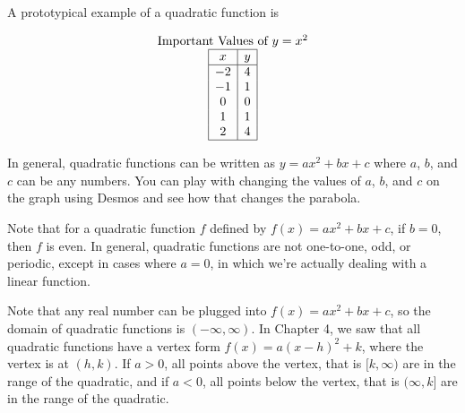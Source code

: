 \documentclass[nooutcomes]{ximera}
\begin{document}
\begin{example}
A prototypical example of a quadratic function is 

\begin{center}
\end{center}

\begin{center}
\end{center}

\[
\begin{array}{c  }
\text{\normalfont Important Values of $y=x^2$} \\
 \begin{array}{|c|c|}
 \hline
 x & y\\
 \hline
 -2&4\\
 -1&1\\
 0&0\\
 1&1\\
 2&4\\
 \hline
\end{array}
\end{array}
\]
\end{example}

In general, quadratic functions can be written as $y=ax^2+bx+c$ where $a$, $b$, and $c$ can be any numbers.  You can play with changing the values of $a$, $b$, and $c$ on the graph using Desmos and see how that changes the parabola.  

\begin{center}  
\end{center}

Note that for a quadratic function $f$ defined by $f(x) = ax^2 + bx + c$, if $b = 0$, then $f$ is even. In general, quadratic functions are not one-to-one, odd, or periodic, except in cases where $a = 0$, in which we're actually dealing with a linear function. 

Note that any real number can be plugged into $f(x) = ax^2 + bx + c$, so the domain of quadratic functions is $(-\infty, \infty)$. In Chapter 4, we saw that all quadratic functions have a vertex form $f(x) = a(x - h)^2 + k$, where the vertex is at $(h, k)$. If $a > 0$, all points above the vertex, that is $[k, \infty)$ are in the range of the quadratic, and if $a < 0$, all points below the vertex, that is $(\infty, k]$ are in the range of the quadratic.
\end{document}
